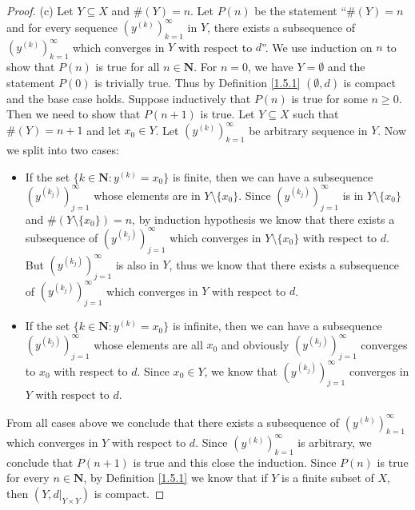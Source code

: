 \begin{proof}{(c)}
    Let \(Y \subseteq X\) and \(\#(Y) = n\).
    Let \(P(n)\) be the statement ``\(\#(Y) = n\) and for every sequence \((y^{(k)})_{k = 1}^\infty\) in \(Y\), there exists a subsequence of \((y^{(k)})_{k = 1}^\infty\) which converges in \(Y\) with respect to \(d\)''.
    We use induction on \(n\) to show that \(P(n)\) is true for all \(n \in \mathbf{N}\).
    For \(n = 0\), we have \(Y = \emptyset\) and the statement \(P(0)\) is trivially true.
    Thus by Definition \ref{1.5.1} \((\emptyset, d)\) is compact and the base case holds.
    Suppose inductively that \(P(n)\) is true for some \(n \geq 0\).
    Then we need to show that \(P(n + 1)\) is true.
    Let \(Y \subseteq X\) such that \(\#(Y) = n + 1\) and let \(x_0 \in Y\).
    Let \((y^{(k)})_{k = 1}^\infty\) be arbitrary sequence in \(Y\).
    Now we split into two cases:
    \begin{itemize}
        \item If the set \(\{k \in \mathbf{N} : y^{(k)} = x_0\}\) is finite, then we can have a subsequence \((y^{(k_j)})_{j = 1}^\infty\) whose elements are in \(Y \setminus \{x_0\}\).
              Since \((y^{(k_j)})_{j = 1}^\infty\) is in \(Y \setminus \{x_0\}\) and \(\#(Y \setminus \{x_0\}) = n\), by induction hypothesis we know that there exists a subsequence of \((y^{(k_j)})_{j = 1}^\infty\) which converges in \(Y \setminus \{x_0\}\) with respect to \(d\).
              But \((y^{(k_j)})_{j = 1}^\infty\) is also in \(Y\), thus we know that there exists a subsequence of \((y^{(k_j)})_{j = 1}^\infty\) which converges in \(Y\) with respect to \(d\).
        \item If the set \(\{k \in \mathbf{N} : y^{(k)} = x_0\}\) is infinite, then we can have a subsequence \((y^{(k_j)})_{j = 1}^\infty\) whose elements are all \(x_0\) and obviously \((y^{(k_j)})_{j = 1}^\infty\) converges to \(x_0\) with respect to \(d\).
              Since \(x_0 \in Y\), we know that \((y^{(k_j)})_{j = 1}^\infty\) converges in \(Y\) with respect to \(d\).
    \end{itemize}
    From all cases above we conclude that there exists a subsequence of \((y^{(k)})_{k = 1}^\infty\) which converges in \(Y\) with respect to \(d\).
    Since \((y^{(k)})_{k = 1}^\infty\) is arbitrary, we conclude that \(P(n + 1)\) is true and this close the induction.
    Since \(P(n)\) is true for every \(n \in \mathbf{N}\), by Definition \ref{1.5.1} we know that if \(Y\) is a finite subset of \(X\), then \((Y, d|_{Y \times Y})\) is compact.
\end{proof}

